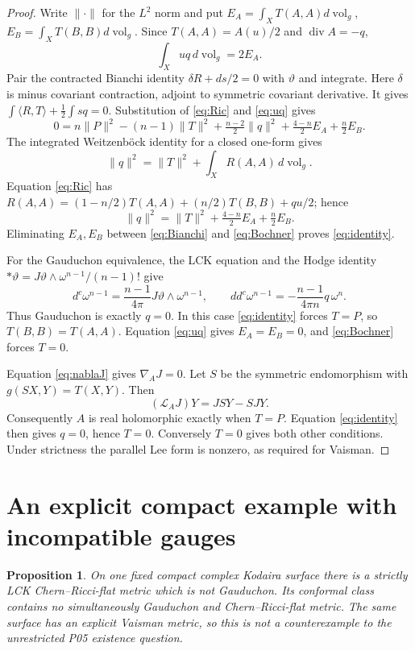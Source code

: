 \documentclass[11pt]{article}
\newtheorem{proposition}[theorem]{Proposition}
\newcommand{\ddc}{dd^c}
\newcommand{\vol}{\operatorname{vol}}
\begin{document}
\begin{proof}
Write $\|\cdot\|$ for the $L^2$ norm and put
$E_A=\int_XT(A,A)d\vol_g$, $E_B=\int_XT(B,B)d\vol_g$.
Since $T(A,A)=A(u)/2$ and $\operatorname{div}A=-q$,
\begin{equation}\label{eq:uq}
 \int_Xuq\,d\vol_g=2E_A.
\end{equation}
Pair the contracted Bianchi identity
$\delta R+ds/2=0$ with $\vartheta$ and integrate. Here $\delta$ is
minus covariant contraction, adjoint to symmetric covariant derivative.
It gives $\int\langle R,T\rangle+\frac12\int s q=0$.
Substitution of \eqref{eq:Ric} and \eqref{eq:uq} gives
\begin{equation}\label{eq:Bianchi}
 0=n\|P\|^2-(n-1)\|T\|^2+\tfrac{n-2}{2}\|q\|^2
                    +\tfrac{4-n}{2}E_A+\tfrac n2E_B.
\end{equation}
The integrated Weitzenb\"ock identity for a closed one-form gives
\[
 \|q\|^2=\|T\|^2+\int_XR(A,A)\,d\vol_g.
\]
Equation \eqref{eq:Ric} has
$R(A,A)=(1-n/2)T(A,A)+(n/2)T(B,B)+qu/2$; hence
\begin{equation}\label{eq:Bochner}
 \|q\|^2=\|T\|^2+\tfrac{4-n}{2}E_A+\tfrac n2E_B.
\end{equation}
Eliminating $E_A,E_B$ between \eqref{eq:Bianchi} and
\eqref{eq:Bochner} proves \eqref{eq:identity}.

For the Gauduchon equivalence, the LCK equation and the Hodge identity
$*\vartheta=J\vartheta\wedge\omega^{n-1}/(n-1)!$ give
\[
 d^c\omega^{n-1}=\frac{n-1}{4\pi}
                       J\vartheta\wedge\omega^{n-1},\qquad
 \ddc\omega^{n-1}=-\frac{n-1}{4\pi n}q\,\omega^n.
\]
Thus Gauduchon is exactly $q=0$. In this case \eqref{eq:identity}
forces $T=P$, so $T(B,B)=T(A,A)$. Equation \eqref{eq:uq} gives
$E_A=E_B=0$, and \eqref{eq:Bochner} forces $T=0$.

Equation \eqref{eq:nablaJ} gives $\nabla_AJ=0$. Let $S$ be the
symmetric endomorphism with $g(SX,Y)=T(X,Y)$. Then
\[
 (\mathcal L_AJ)Y=JSY-SJY.
\]
Consequently $A$ is real holomorphic exactly when $T=P$.
Equation \eqref{eq:identity} then gives $q=0$, hence $T=0$.
Conversely $T=0$ gives both other conditions. Under strictness the
parallel Lee form is nonzero, as required for Vaisman.
\end{proof}

\section{An explicit compact example with incompatible gauges}
\begin{proposition}\label{prop:example}
On one fixed compact complex Kodaira surface there is a strictly LCK
Chern--Ricci-flat metric which is not Gauduchon. Its conformal class
contains no simultaneously Gauduchon and Chern--Ricci-flat metric.
The same surface has an explicit Vaisman metric, so this is not a
counterexample to the unrestricted P05 existence question.
\end{proposition}
\end{document}
